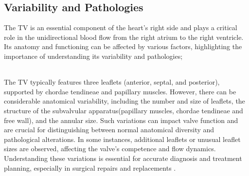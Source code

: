 \subsection{Variability and Pathologies}\label{sec:varpath}
The \gls{TV} is an essential component of the heart's right side and plays a critical role in the unidirectional blood flow from the right atrium to the right ventricle. Its anatomy and functioning can be affected by various factors, highlighting the importance of understanding its variability and pathologies;

\\
The \gls{TV} typically features three leaflets (anterior, septal, and posterior), supported by chordae tendineae and papillary muscles. However, there can be considerable anatomical variability, including the number and size of leaflets, the structure of the subvalvular apparatus(papillary muscles, chordae tendineae and free wall), and the annular size. Such variations can impact valve function and are crucial for distinguishing between normal anatomical diversity and pathological alterations. In some instances, additional leaflets or unusual leaflet sizes are observed, affecting the valve's competence and flow dynamics. Understanding these variations is essential for accurate diagnosis and treatment planning, especially in surgical repairs and replacements .~

